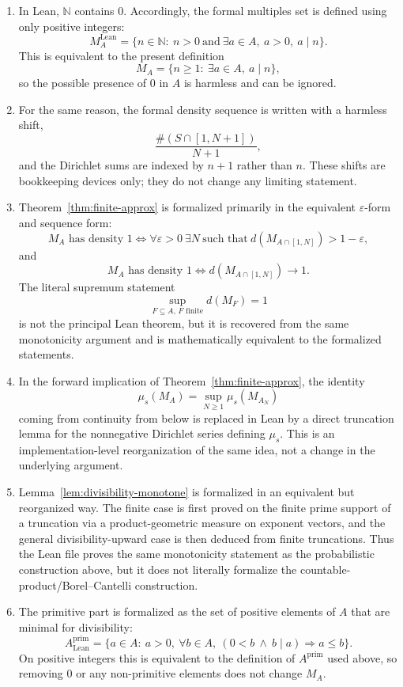 \documentclass[11pt]{article}
\theoremstyle{definition}
\theoremstyle{remark}
\newcommand{\PP}{A^{\mathrm{prim}}}
\begin{document}
\begin{enumerate}
\item In Lean, \(\mathbb N\) contains \(0\).
Accordingly, the formal multiples set is defined using only positive integers:
\[
M_A^{\mathrm{Lean}}
=
\{n\in\mathbb N:\ n>0\ \text{and}\ \exists a\in A,\ a>0,\ a\mid n\}.
\]
This is equivalent to the present definition
\[
M_A=\{n\ge 1:\ \exists a\in A,\ a\mid n\},
\]
so the possible presence of \(0\) in \(A\) is harmless and can be ignored.

\item For the same reason, the formal density sequence is written with a harmless shift,
\[
\frac{\#(S\cap[1,N+1])}{N+1},
\]
and the Dirichlet sums are indexed by \(n+1\) rather than \(n\).
These shifts are bookkeeping devices only; they do not change any limiting statement.

\item Theorem~\ref{thm:finite-approx} is formalized primarily in the equivalent \(\varepsilon\)-form and sequence form:
\[
M_A\text{ has density }1
\iff
\forall\varepsilon>0\ \exists N\ \text{such that}\ d(M_{A\cap[1,N]})>1-\varepsilon,
\]
and
\[
M_A\text{ has density }1
\iff
d(M_{A\cap[1,N]})\to 1.
\]
The literal supremum statement
\[
\sup_{F\subseteq A,\,F\text{ finite}} d(M_F)=1
\]
is not the principal Lean theorem, but it is recovered from the same monotonicity argument and is mathematically equivalent to the formalized statements.

\item In the forward implication of Theorem~\ref{thm:finite-approx}, the identity
\[
\mu_s(M_A)=\sup_{N\ge 1}\mu_s(M_{A_N})
\]
coming from continuity from below is replaced in Lean by a direct truncation lemma for the nonnegative Dirichlet series defining \(\mu_s\).
This is an implementation-level reorganization of the same idea, not a change in the underlying argument.

\item Lemma~\ref{lem:divisibility-monotone} is formalized in an equivalent but reorganized way.
The finite case is first proved on the finite prime support of a truncation via a product-geometric measure on exponent vectors, and the general divisibility-upward case is then deduced from finite truncations.
Thus the Lean file proves the same monotonicity statement as the probabilistic construction above, but it does not literally formalize the countable-product/Borel--Cantelli construction.

\item The primitive part is formalized as the set of positive elements of \(A\) that are minimal for divisibility:
\[
A^{\mathrm{prim}}_{\mathrm{Lean}}
=
\{a\in A:\ a>0,\ \forall b\in A,\ (0<b\ \wedge\ b\mid a)\Rightarrow a\le b\}.
\]
On positive integers this is equivalent to the definition of \(\PP\) used above, so removing \(0\) or any non-primitive elements does not change \(M_A\).


\end{enumerate}
\end{document}
